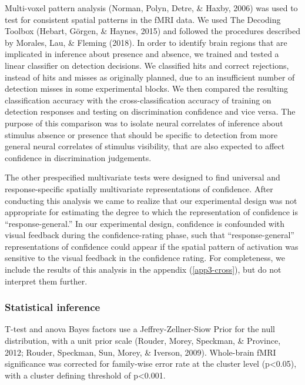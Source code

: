 \documentclass[12pt,twoside]{reedthesis}
\begin{document}
Multi-voxel pattern analysis (Norman, Polyn, Detre, \& Haxby, 2006) was used to test for consistent spatial patterns in the fMRI data. We used The Decoding Toolbox (Hebart, Görgen, \& Haynes, 2015) and followed the procedures described by Morales, Lau, \& Fleming (2018). In order to identify brain regions that are implicated in inference about presence and absence, we trained and tested a linear classifier on detection decisions. We classified hits and correct rejections, instead of hits and misses as originally planned, due to an insufficient number of detection misses in some experimental blocks. We then compared the resulting classification accuracy with the cross-classification accuracy of training on detection responses and testing on discrimination confidence and vice versa. The purpose of this comparison was to isolate neural correlates of inference about stimulus absence or presence that should be specific to detection from more general neural correlates of stimulus visibility, that are also expected to affect confidence in discrimination judgements.

The other prespecified multivariate tests were designed to find universal and response-specific spatially multivariate representations of confidence. After conducting this analysis we came to realize that our experimental design was not appropriate for estimating the degree to which the representation of confidence is ``response-general.'' In our experimental design, confidence is confounded with visual feedback during the confidence-rating phase, such that ``response-general'' representations of confidence could appear if the spatial pattern of activation was sensitive to the visual feedback in the confidence rating. For completeness, we include the results of this analysis in the appendix (\ref{app3-cross}), but do not interpret them further.

\hypertarget{statistical-inference-1}{%
\subsubsection{Statistical inference}\label{statistical-inference-1}}

T-test and anova Bayes factors use a Jeffrey-Zellner-Siow Prior for the null distribution, with a unit prior scale (Rouder, Morey, Speckman, \& Province, 2012; Rouder, Speckman, Sun, Morey, \& Iverson, 2009). Whole-brain fMRI significance was corrected for family-wise error rate at the cluster level (p\textless0.05), with a cluster defining threshold of p\textless0.001.
\end{document}
